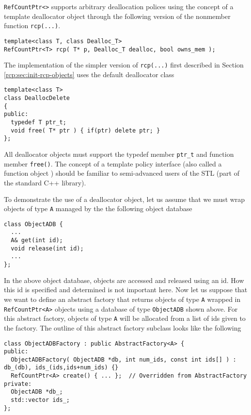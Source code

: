 {}\texttt{Ref\-Count\-Ptr<>} supports arbitrary deallocation polices
using the concept of a template deallocator object through the
following version of the nonmember function {}\texttt{rcp(...)}.

{\scriptsize\begin{verbatim}
template<class T, class Dealloc_T>
RefCountPtr<T> rcp( T* p, Dealloc_T dealloc, bool owns_mem );
\end{verbatim}}

The implementation of the simpler version of {}\texttt{rcp(...)} first
described in Section {}\ref{rcp:sec:init-rcp-objects} uses the default
deallocator class

{\scriptsize\begin{verbatim}
template<class T>
class DeallocDelete
{
public:
  typedef T ptr_t;
  void free( T* ptr ) { if(ptr) delete ptr; }
};
\end{verbatim}}

All deallocator objects must support the typedef member
{}\texttt{ptr\_t} and function member {}\texttt{free()}.  The concept
of a template policy interface (also called a function object
\cite[Section 18.4]{ref:stroustrup_2000}) should be familiar to
semi-advanced users of the STL (part of the standard C++ library).

To demonstrate the use of a deallocator object, let us assume that we
must wrap objects of type {}\texttt{A} managed by the the following
object database

{\scriptsize\begin{verbatim}
class ObjectADB {
  ...
  A& get(int id);
  void release(int id);
  ...
};
\end{verbatim}}

In the above object database, objects are accessed and released using
an id.  How this id is specified and determined is not important here.
Now let us suppose that we want to define an abstract factory that
returns objects of type {}\texttt{A} wrapped in
{}\texttt{RefCountPtr<A>} objects using a database of type
{}\texttt{ObjectADB} shown above.  For this abstract factory, objects
of type {}\texttt{A} will be allocated from a list of ids given to the
factory.  The outline of this abstract factory subclass looks like the
following

{\scriptsize\begin{verbatim}
class ObjectADBFactory : public AbstractFactory<A> {
public:
  ObjectADBFactory( ObjectADB *db, int num_ids, const int ids[] ) : db_(db), ids_(ids,ids+num_ids) {}
  RefCountPtr<A> create() { ... };  // Overridden from AbstractFactory
private:
  ObjectADB *db_;
  std::vector ids_;
};
\end{verbatim}}

